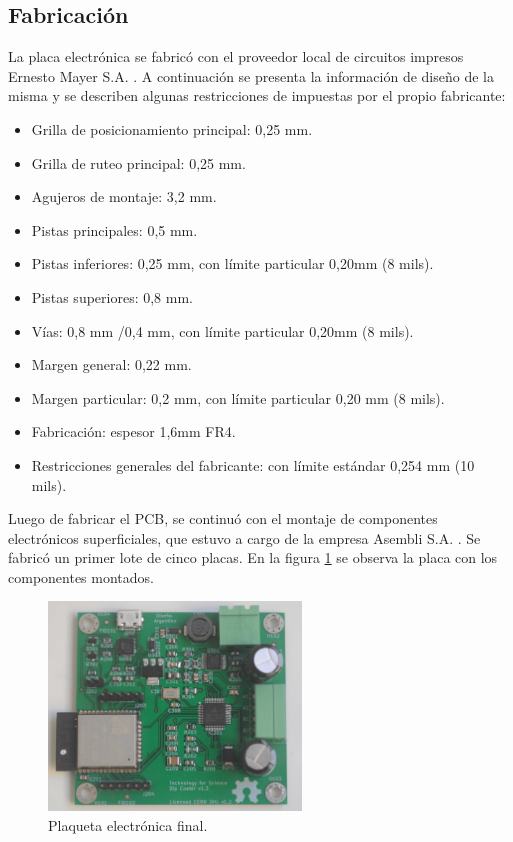  
\subsection{Fabricación}
La placa electrónica se fabricó con el proveedor local de circuitos impresos Ernesto Mayer S.A. \citep{web_mayer}. A continuación se presenta la información de diseño de la misma y se describen algunas  restricciones de impuestas por el propio fabricante:

\begin{itemize}

\item Grilla de posicionamiento principal: 0,25 mm.
\item Grilla de ruteo principal: 0,25 mm.
\item Agujeros de montaje: 3,2 mm.
\item Pistas principales: 0,5 mm.
\item Pistas inferiores: 0,25 mm, con límite particular 0,20mm (8 mils).
\item Pistas superiores: 0,8 mm.
\item Vías: 0,8 mm /0,4 mm, con límite particular 0,20mm (8 mils).
\item Margen general: 0,22 mm.
\item Margen particular: 0,2 mm, con límite particular 0,20 mm (8 mils).
\item Fabricación: espesor 1,6mm FR4.  
\item Restricciones generales del fabricante: con límite estándar 0,254 mm (10 mils).

\end{itemize}

Luego de fabricar el PCB, se continuó con el montaje de componentes electrónicos superficiales, que estuvo a cargo de la empresa Asembli S.A. \citep{web_asembli}. Se fabricó un primer lote de cinco placas. En la figura \ref{fig:dip_real_model} se observa la placa con los componentes montados.


\begin{figure}[htbp]
	\centering
	\includegraphics[width=0.6\textwidth]{./Figures/dip_real_model.jpg}
	\caption{Plaqueta electrónica final.}
	\label{fig:dip_real_model}
\end{figure}


